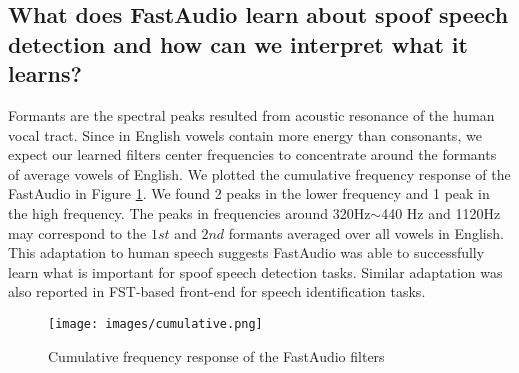 \documentclass[conference]{IEEEtran}
\begin{document}
\subsection{\textbf{What does FastAudio learn about spoof speech detection and how can we interpret what it learns?}}

Formants are the spectral peaks resulted from acoustic resonance of the human vocal tract. Since in English vowels contain more energy than consonants, we expect our learned filters center frequencies to concentrate around the formants of average vowels of English\cite{Lindblom1990ExplainingPV}. We plotted the cumulative frequency response of the FastAudio in Figure \ref{fig:cumulative}. We found 2 peaks in the lower frequency and 1 peak in the high frequency. The peaks in frequencies around 320Hz$\sim$440 Hz and 1120Hz may correspond to the $1st$ and $2nd$ formants averaged over all vowels in English\cite{Ravanelli2018SpeakerRF}. This adaptation to human speech suggests FastAudio was able to successfully learn what is important for spoof speech detection tasks. Similar adaptation was also reported in FST-based front-end for speech identification tasks\cite{Ravanelli2018SpeakerRF}.

\begin{figure}[hpbt]
\centering
\texttt{[image: images/cumulative.png]}
\caption{Cumulative frequency response of the FastAudio filters}
\label{fig:cumulative}
\end{figure}
\end{document}
